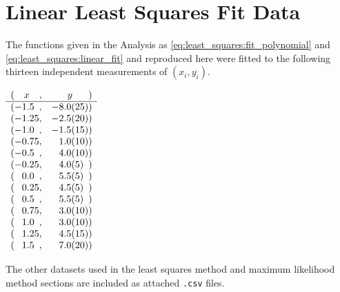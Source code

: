 
\section*{Linear Least Squares Fit Data}
The functions given in the Analysis as \autoref{eq:least_squares:fit_polynomial} and \autoref{eq:least_squares:linear_fit} and reproduced here were fitted to the following thirteen independent measurements of $(x_i, y_i)$.

\begin{table}[htbp]
    \centering
    \caption{Given 13 Data Points for Applying Linear Least Squares Fit}
    \label{tab:appendix:least_squares_data}
    \(
    \begin{array}{
            c@{}
            S[table-format=+1.2]@{}
            c
            S[table-format=+1.1(2)]@{}
            c
        }
        ( &  {x}  & , &  {y}         & ) \\ \hline
        ( & -1.5  & , & -8.0 \pm 2.5 & ) \\
        ( & -1.25 & , & -2.5 \pm 2.0 & ) \\
        ( & -1.0  & , & -1.5 \pm 1.5 & ) \\
        ( & -0.75 & , &  1.0 \pm 1.0 & ) \\
        ( & -0.5  & , &  4.0 \pm 1.0 & ) \\
        ( & -0.25 & , &  4.0 \pm 0.5 & ) \\
        ( &  0.0  & , &  5.5 \pm 0.5 & ) \\
        ( & 0.25  & , &  4.5 \pm 0.5 & ) \\
        ( & 0.5   & , &  5.5 \pm 0.5 & ) \\
        ( & 0.75  & , &  3.0 \pm 1.0 & ) \\
        ( & 1.0   & , &  3.0 \pm 1.0 & ) \\
        ( & 1.25  & , &  4.5 \pm 1.5 & ) \\
        ( & 1.5   & , &  7.0 \pm 2.0 & )
    \end{array}
    \)
\end{table}


The other datasets used in the least squares method and maximum likelihood method sections are included as attached \verb|.csv| files.
